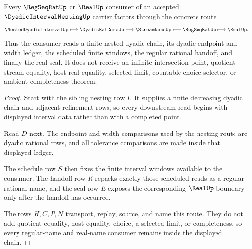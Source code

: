 \begin{theorem}\label{thm:dyadic-interval-nesting-regular-name-route}
Every $\RegSeqRatUp$ or $\RealUp$ consumer of an accepted $\DyadicIntervalNestingUp$ carrier factors through the concrete route
$$
\NestedDyadicIntervalUp \longmapsto \DyadicRatCoreUp \longmapsto \StreamNameUp \longmapsto \RegSeqRatUp \longmapsto \RealUp .
$$
Thus the consumer reads a finite nested dyadic chain, its dyadic endpoint and width ledger, the scheduled finite windows, the regular rational handoff, and finally the real seal. It does not receive an infinite intersection point, quotient stream equality, host real equality, selected limit, countable-choice selector, or ambient completeness theorem.
\end{theorem}
\begin{proof}
Start with the sibling nesting row $I$. It supplies a finite decreasing dyadic chain and adjacent refinement rows, so every downstream read begins with displayed interval data rather than with a completed point.

Read $D$ next. The endpoint and width comparisons used by the nesting route are dyadic rational rows, and all tolerance comparisons are made inside that displayed ledger.

The schedule row $S$ then fixes the finite interval windows available to the consumer. The handoff row $R$ repacks exactly those scheduled reads as a regular rational name, and the seal row $E$ exposes the corresponding $\RealUp$ boundary only after the handoff has occurred.

The rows $H,C,P,N$ transport, replay, source, and name this route. They do not add quotient equality, host equality, choice, a selected limit, or completeness, so every regular-name and real-name consumer remains inside the displayed chain.
\end{proof}

